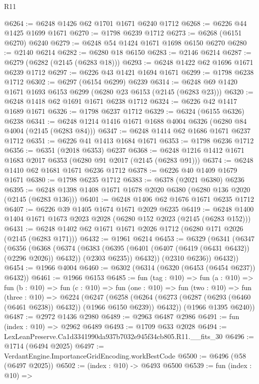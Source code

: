 \begin{lexlean}{R11}
\begin{coremodule}
@6264 := @6248 @1426 @62 @1701 @1671 @6240 @1712
@6268 := @6226 @44 @1425 @1699 @1671
@6270 := @1798 @6239 @1712
@6273 := @6268 (@6151 @6270) @6240
@6279 := @6248 @54 @1424 @1671 @1698 @6150 @6270
@6280 := @2140 @6214
@6282 := @6280 @18 @6150
@6283 := @2146 @6214
@6287 := @6279 (@6282 (@2145 (@6283 @18)))
@6293 := @6248 @1422 @62 @1696 @1671 @6239 @1712
@6297 := @6226 @43 @1421 @1694 @1671
@6299 := @1798 @6238 @1712
@6302 := @6297 (@6154 @6299) @6239
@6314 := @6248 @69 @1420 @1671 @1693 @6153 @6299 (@6280 @23 @6153 (@2145 (@6283 @23)))
@6320 := @6248 @1418 @62 @1691 @1671 @6238 @1712
@6324 := @6226 @42 @1417 @1689 @1671
@6326 := @1798 @6237 @1712
@6329 := @6324 (@6155 @6326) @6238
@6341 := @6248 @1214 @1416 @1671 @1688 @4004 @6326 (@6280 @84 @4004 (@2145 (@6283 @84)))
@6347 := @6248 @1414 @62 @1686 @1671 @6237 @1712
@6351 := @6226 @41 @1413 @1684 @1671
@6353 := @1798 @6236 @1712
@6356 := @6351 (@2018 @6353) @6237
@6368 := @6248 @1216 @1412 @1671 @1683 @2017 @6353 (@6280 @91 @2017 (@2145 (@6283 @91)))
@6374 := @6248 @1410 @62 @1681 @1671 @6236 @1712
@6378 := @6226 @40 @1409 @1679 @1671
@6380 := @1798 @6235 @1712
@6383 := @6378 (@2021 @6380) @6236
@6395 := @6248 @1398 @1408 @1671 @1678 @2020 @6380 (@6280 @136 @2020 (@2145 (@6283 @136)))
@6401 := @6248 @1406 @62 @1676 @1671 @6235 @1712
@6407 := @6226 @39 @1405 @1674 @1671 @2029 @6235
@6419 := @6248 @1400 @1404 @1671 @1673 @2023 @2028 (@6280 @152 @2023 (@2145 (@6283 @152)))
@6431 := @6248 @1402 @62 @1671 @1671 @2026 @1712 (@6280 @171 @2026 (@2145 (@6283 @171)))
@6432 := @1961 @6214
@6453 := @6329
    (@6341
      (@6347
        (@6356
          (@6368
            (@6374
              (@6383
                (@6395 (@6401 (@6407 (@6419 (@6431 @6432)) (@2296 @2026)) @6432))
                (@2303 @6235))
              @6432))
          (@2310 @6236))
        @6432))
@6454 := @1966 @4004
@6460 := @6302 (@6314 (@6320 (@6453 (@6454 @6237)) @6432))
@6461 := @1966 @6153
@6485 := fun (tag : @10) =>
  fun (a : @10) =>
  fun (b : @10) =>
  fun (c : @10) =>
  fun (one : @10) =>
  fun (two : @10) =>
  fun (three : @10) =>
  @6224
    (@6247
      (@6258 (@6264 (@6273 (@6287 (@6293 (@6460 (@6461 @6238)) @6432)) (@1966 @6150 @6239)) @6432))
      (@1966 @1395 @6240))
@6487 := @2972 @1436 @2980
@6489 := @2963 @6487 @2986
@6491 := fun (index : @10) => @2962 @6489
@6493 := @1709 @633 @2028
@6494 := LexLeanPreserve.Ca1d3341990da937b7032e945f34cb805.R11.__fits_30
@6496 := @1714 (@6494 @2025)
@6497 := VerdantEngine.ImportanceGridEncoding.workBestCode
@6500 := @6496 (@58 (@6497 @2025))
@6502 := (index : @10) -> @6493 @6500
@6539 := fun (index : @10) =>

\end{coremodule}
\end{lexlean}
